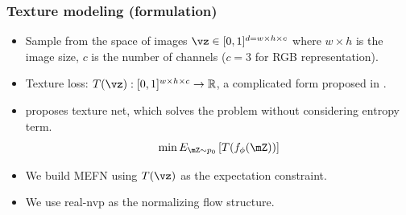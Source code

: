 \documentclass[16pt,presentation]{beamer}
\begin{document}
\begin{frame}
\frametitle{Texture modeling (formulation)}
\begin{itemize}
\item Sample from the space of images $\vz \in [0,1]^{d = w \times h \times c}$ where $w \times h$ is the image size, $c$ is the number of channels ($c = 3$ for RGB representation). 
\item Texture loss: $T(\vz): [0,1]^{w \times h \times c} \rightarrow \mathbb{R}$, a complicated form proposed in \textcite{ulyanov2016texture}.
\item \textcite{ulyanov2016texture} proposes texture net, which solves the problem \alert{without considering entropy term.}
\[\min E_{\mZ \sim p_0}\left[ T(f_\phi(\mZ)) \right] \]
\item We build MEFN using $T(\vz)$ as the expectation constraint. 
\item We use real-nvp \parencite{dinh2016density} as the normalizing flow structure.
\end{itemize}
\end{frame}
\end{document}
